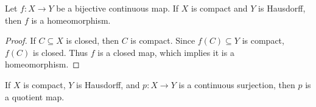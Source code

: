 \begin{proposition}
    Let $f:X \rightarrow Y$ be a bijective continuous map. If $X$ is compact and $Y$ is Hausdorff, then $f$ is a homeomorphism.
\end{proposition}
    \begin{proof}
        If $C \subseteq X$ is closed, then $C$ is compact. Since $f(C) \subseteq Y$ is compact, $f(C)$ is closed. Thus $f$ is a closed map, which implies it is a homeomorphism.
    \end{proof}

\begin{corollary}
    If $X$ is compact, $Y$ is Hausdorff, and $p:X \rightarrow Y$ is a continuous surjection, then $p$ is a quotient map.
\end{corollary}
